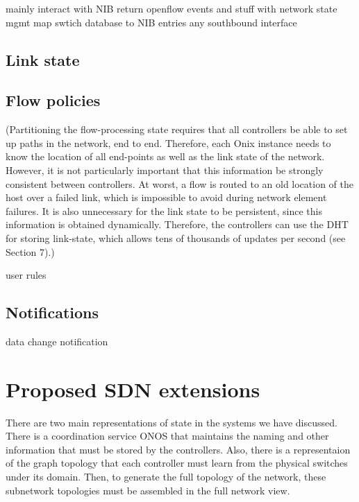 \documentclass[letterpaper,twocolumn,10pt]{article}
\begin{document}
    mainly interact with NIB
    return openflow events and stuff with network state mgmt
        map swtich database to NIB entries
        any southbound interface





\subsection*{Link state}




\subsection*{Flow policies}


(Partitioning the flow-processing state requires that all controllers be able to set up paths in the network, end to end. Therefore, each Onix instance needs to know the location of all end-points as well as the link state of the network. However, it is not particularly important that this information be strongly consistent between controllers. At worst, a flow is routed to an old location of the host over a failed link, which is impossible to avoid during network element failures.
It is also unnecessary for the link state to be persistent, since this information is obtained dynamically. Therefore, the controllers can use the DHT for storing link-state, which allows tens of thousands of updates per second (see Section 7).)

user rules




\subsection*{Notifications}
data change notification

    

\section{Proposed SDN extensions}

There are two main representations of state in the systems we have discussed. There is a coordination service ONOS that maintains the naming and other information that must be stored by the controllers. Also, there is a representaion of the graph topology that each controller must learn from the physical switches under its domain. Then, to generate the full topology of the network, these subnetwork topologies must be assembled in the full network view.
\end{document}
